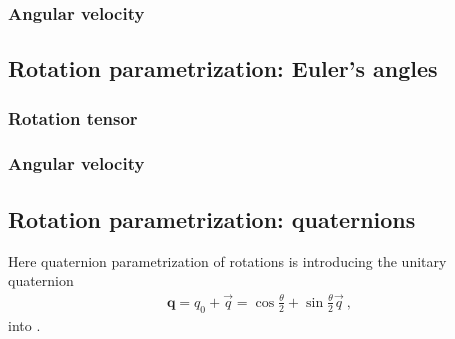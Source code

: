 \documentclass[letterpaper,10pt,english]{jupyterBook}
\begin{document}
\subsubsection{Angular velocity}
\label{\detokenize{ch/kinematics-rotations-param-axis-angle:angular-velocity}}\label{\detokenize{ch/kinematics-rotations-param-axis-angle:classical-mechanics-kinematics-rotations-axis-angle-angular-velocity}}
\sphinxstepscope


\subsection{Rotation parametrization: Euler’s angles}
\label{\detokenize{ch/kinematics-rotations-param-euler:rotation-parametrization-euler-s-angles}}\label{\detokenize{ch/kinematics-rotations-param-euler:classical-mechanics-kinematics-rotations-euler}}\label{\detokenize{ch/kinematics-rotations-param-euler::doc}}

\subsubsection{Rotation tensor}
\label{\detokenize{ch/kinematics-rotations-param-euler:rotation-tensor}}\label{\detokenize{ch/kinematics-rotations-param-euler:classical-mechanics-kinematics-rotations-euler-rotation-tensor}}

\subsubsection{Angular velocity}
\label{\detokenize{ch/kinematics-rotations-param-euler:angular-velocity}}\label{\detokenize{ch/kinematics-rotations-param-euler:classical-mechanics-kinematics-rotations-euler-angular-velocity}}
\sphinxstepscope


\subsection{Rotation parametrization: quaternions}
\label{\detokenize{ch/kinematics-rotations-param-quaternions:rotation-parametrization-quaternions}}\label{\detokenize{ch/kinematics-rotations-param-quaternions:classical-mechanics-kinematics-rotations-quaternions}}\label{\detokenize{ch/kinematics-rotations-param-quaternions::doc}}
\sphinxAtStartPar
Here quaternion parametrization of rotations is introducing the unitary quaternion
\begin{equation}\label{equation:ch/kinematics-rotations-param-quaternions:eq:q:rot}
\begin{split}\mathbf{q} = q_0 + \vec{q} = \cos \frac{\theta}{2} + \sin \frac{\theta}{2} \vec{q} \ ,\end{split}
\end{equation}
\sphinxAtStartPar
into {\hyperref[\detokenize{ch/kinematics-rotations-param-axis-angle:classical-mechanics-kinematics-rotations-axis-angle}]{}}.
\end{document}
